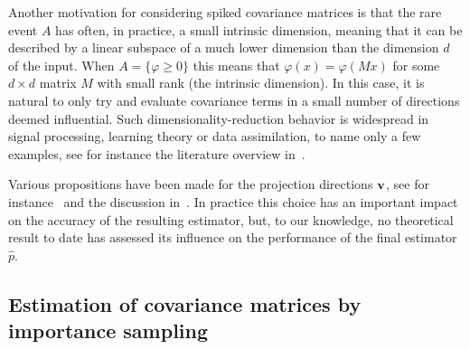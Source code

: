\documentclass[]{article}
\theoremstyle{plain}
\theoremstyle{definition}
\begin{document}
Another motivation for considering spiked covariance matrices is that the rare event $A$ has often, in practice, a small intrinsic dimension, meaning that it can be described by a linear subspace of a much lower dimension than the dimension $d$ of the input. When $A = \{ \varphi \geq 0\}$ this means that $\varphi(x) = \varphi(Mx)$ for some $d \times d$ matrix $M$ with small rank (the intrinsic dimension). In this case, it is natural to only try and evaluate covariance terms in a small number of directions deemed influential. Such dimensionality-reduction behavior is widespread in signal processing, learning theory or data assimilation, to name only a few examples, see for instance the literature overview in~\cite{agapiou_importance_2017}.


Various propositions have been made for the projection directions ${\bf v}$, see for instance~\cite{el_masri2024, ELMASRI2021, uribe2021} and the discussion in~\cite[Section $2.3$]{beh2023insight}. In practice this choice has an important impact on the accuracy of the resulting estimator, but, to our knowledge, no theoretical result to date has assessed its influence on the performance of the final estimator $\hat p$.

\subsection{Estimation of covariance matrices by importance sampling}
\end{document}
